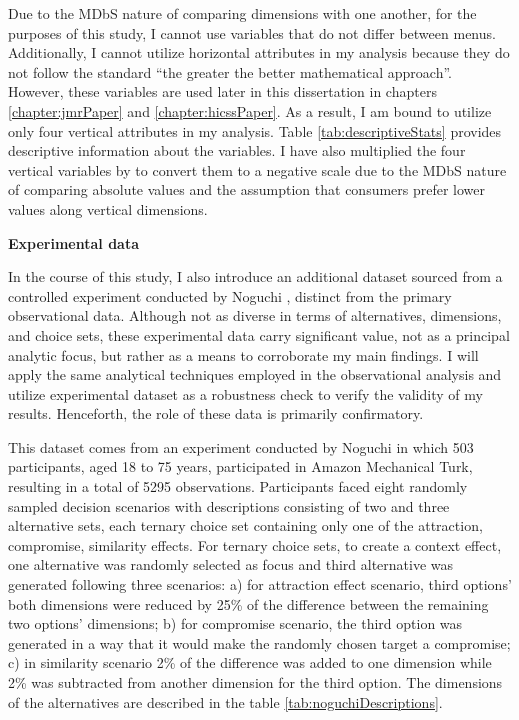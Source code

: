 \documentclass[a4paper,12pt]{article}
\newcommand{\citeyearonly}[1]{\citeyearpar{#1}}
\begin{document}
Due to the MDbS nature of comparing dimensions with one another, for the purposes of this study, I cannot use variables that do not differ between menus. Additionally, I cannot utilize horizontal attributes in my analysis because they do not follow the standard ``the greater the better mathematical approach''. However, these variables are used later in this dissertation in chapters \ref{chapter:jmrPaper} and \ref{chapter:hicssPaper}. As a result, I am bound to utilize only four vertical attributes in my analysis. Table \ref{tab:descriptiveStats} provides descriptive information about the variables. I have also multiplied the four vertical variables by  to convert them to a negative scale due to the MDbS nature of comparing absolute values and the assumption that consumers prefer lower values along vertical dimensions.

\textbf{Experimental data}

In the course of this study, I also introduce an additional dataset sourced from a controlled experiment conducted by Noguchi \citeyearonly{noguchi2018multialternative}, distinct from the primary observational data. Although not as diverse in terms of alternatives, dimensions, and choice sets, these experimental data carry significant value, not as a principal analytic focus, but rather as a means to corroborate my main findings. I will apply the same analytical techniques employed in the observational analysis and utilize experimental dataset as a robustness check to verify the validity of my results. Henceforth, the role of these data is primarily confirmatory.

This dataset comes from an experiment conducted by Noguchi \citeyearonly{noguchi2018multialternative} in which 503 participants, aged 18 to 75 years, participated in Amazon Mechanical Turk, resulting in a total of 5295 observations. Participants faced eight randomly sampled decision scenarios with descriptions consisting of two and three alternative sets, each ternary choice set containing only one of the attraction, compromise, similarity effects. For ternary choice sets, to create a context effect, one alternative was randomly selected as focus and third alternative was generated following three scenarios: a) for attraction effect scenario, third options' both dimensions were reduced by 25\% of the difference between the remaining two options' dimensions; b) for compromise scenario, the third option was generated in a way that it would make the randomly chosen target a compromise; c) in similarity scenario 2\% of the difference was added to one dimension while 2\% was subtracted from another dimension for the third option. The dimensions of the alternatives are described in the table \ref{tab:noguchiDescriptions}.
\end{document}
